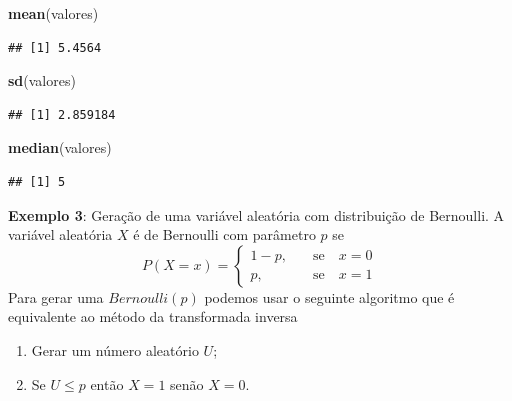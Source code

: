 \documentclass[
]{book}
\newenvironment{Shaded}{\begin{snugshade}}{\end{snugshade}}
\newcommand{\FunctionTok}[1]{\textcolor[rgb]{0.13,0.29,0.53}{\textbf{#1}}}
\newcommand{\NormalTok}[1]{#1}
\providecommand{\tightlist}{%
  \setlength{\itemsep}{0pt}\setlength{\parskip}{0pt}}
\begin{document}
\begin{Shaded}
\begin{Highlighting}[]
\FunctionTok{mean}\NormalTok{(valores)}
\end{Highlighting}
\end{Shaded}

\begin{verbatim}
## [1] 5.4564
\end{verbatim}

\begin{Shaded}
\begin{Highlighting}[]
\FunctionTok{sd}\NormalTok{(valores)}
\end{Highlighting}
\end{Shaded}

\begin{verbatim}
## [1] 2.859184
\end{verbatim}

\begin{Shaded}
\begin{Highlighting}[]
\FunctionTok{median}\NormalTok{(valores)}
\end{Highlighting}
\end{Shaded}

\begin{verbatim}
## [1] 5
\end{verbatim}

\textbf{Exemplo 3}: Geração de uma variável aleatória com distribuição de
Bernoulli. A variável aleatória \(X\) é de Bernoulli com parâmetro \(p\) se
\[P(X = x) = \begin{cases} 1-p,& \quad \text{se} \quad x=0\\
p,& \quad \text{se} \quad x=1 \end{cases}\] Para gerar uma
\(Bernoulli(p)\) podemos usar o seguinte algoritmo que é equivalente ao
método da transformada inversa

\begin{enumerate}
\def\labelenumi{\arabic{enumi}.}
\tightlist
\item
  Gerar um número aleatório \(U\);
\item
  Se \(U \leq p\) então \(X=1\) senão \(X=0\).
\end{enumerate}
\end{document}
